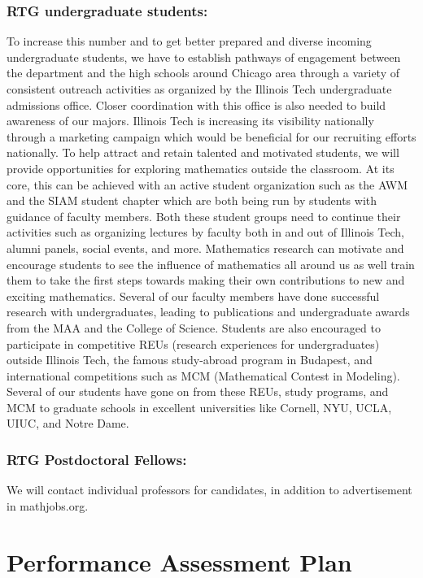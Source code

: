\documentclass[11pt]{NSFamsart}
\begin{document}
  \subsubsection*{RTG undergraduate students:} 
 To increase this number and to get better prepared and diverse incoming undergraduate students,
we have to establish pathways of engagement between the department and the high schools around Chicago area through a variety of consistent outreach activities as organized by the Illinois Tech undergraduate admissions office. Closer coordination with this   office is also needed to build awareness of our majors. Illinois Tech  is increasing its visibility nationally through a marketing campaign which would be beneficial for our recruiting efforts nationally.
To help attract and retain talented and motivated students, we will provide opportunities for exploring mathematics outside the classroom. At its core, this can be achieved with an active student organization such as the AWM and the SIAM student chapter which are both being run by students with guidance of faculty members. Both these student groups need to continue their activities such as organizing lectures by faculty both in and out of Illinois Tech, alumni panels, social events, and more. Mathematics research can motivate and encourage students to see the influence of mathematics all around us as well train them to take the first steps towards making their own contributions to new and exciting mathematics. Several of our faculty members have done successful research with undergraduates, leading to publications and undergraduate awards from the MAA and the College of Science. Students are also encouraged to participate in competitive REUs (research experiences for undergraduates) outside Illinois Tech, the famous study-abroad program in Budapest, and international competitions such as MCM (Mathematical Contest in Modeling). Several of our students have gone on from these REUs, study programs, and MCM to graduate schools in excellent universities like Cornell, NYU, UCLA, UIUC, and Notre Dame.

\subsubsection*{RTG Postdoctoral Fellows:} We will contact individual professors for candidates, in addition to advertisement in mathjobs.org.


\section{Performance Assessment Plan  }
 
\end{document}
